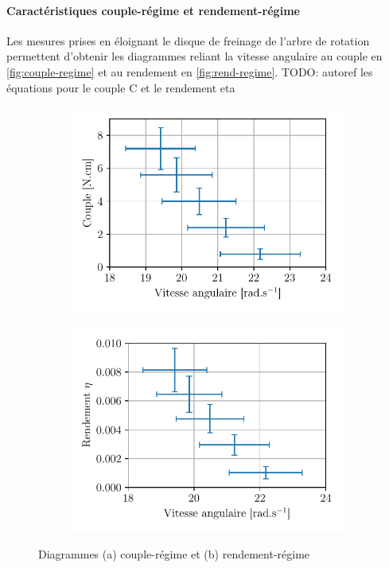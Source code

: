 \paragraph*{Caractéristiques couple-régime et rendement-régime}
Les mesures prises en éloignant le disque de freinage de l'arbre de rotation permettent d'obtenir les diagrammes reliant la vitesse angulaire au couple en \autoref{fig:couple-regime} et au rendement en \autoref{fig:rend-regime}. TODO: autoref les équations pour le couple C et le rendement eta

\begin{figure}[h]
    \centering
    \begin{subfigure}{0.5\linewidth}
        \centering
        \includegraphics[width=\linewidth]{figures/couple-regime.pdf}
        \caption{}
        \label{fig:couple-regime}
    \end{subfigure}%
    \begin{subfigure}{0.5\linewidth}
        \centering
        \includegraphics[width=\linewidth]{figures/rendement-regime.pdf}
        \caption{}
        \label{fig:rend-regime}
    \end{subfigure}
    \caption{Diagrammes (a) couple-régime et (b) rendement-régime}
\end{figure}



